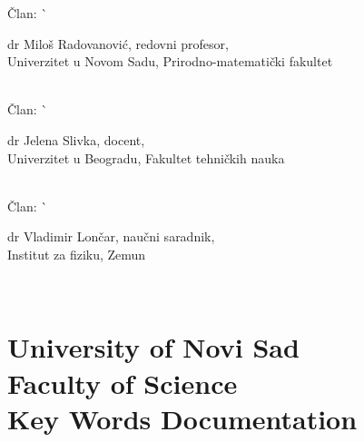 \begin{tabbing}
  Član:                    \`
    \begin{minipage}[t]{.7\textwidth}
    dr Miloš Radovanović, redovni profesor,\\
    Univerzitet u Novom Sadu, Prirodno-matematički fakultet
    \vspace*{1mm}
    \end{minipage}                                          \\
  Član:                    \`
    \begin{minipage}[t]{.7\textwidth}
    dr Jelena Slivka, docent,\\
    Univerzitet u Beogradu, Fakultet tehničkih nauka
    \vspace*{1mm}
    \end{minipage}                                          \\
  Član:                    \`
    \begin{minipage}[t]{.7\textwidth}
    dr Vladimir Lončar, naučni saradnik,\\
    Institut za fiziku, Zemun
    \vspace*{1mm}
    \end{minipage}                                          \\
\end{tabbing}

\chapter[Key Words Documentation]{\Large University of Novi Sad\\
          Faculty of Science\\
          Key Words Documentation}
 

